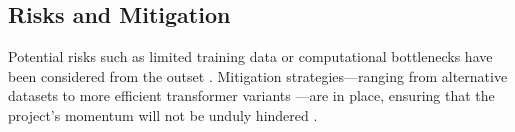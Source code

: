 \subsection{Risks and Mitigation}
Potential risks such as limited training data or computational bottlenecks have been considered from the outset \cite{RefWorks:RefID:22-gao2020pile:}. Mitigation strategies—ranging from alternative datasets \cite{RefWorks:RefID:26-liu2024datasets} to more efficient transformer variants \cite{RefWorks:RefID:21-fedus2022switch}—are in place, ensuring that the project’s momentum will not be unduly hindered \cite{RefWorks:RefID:18-rajbhandarizero:}.
